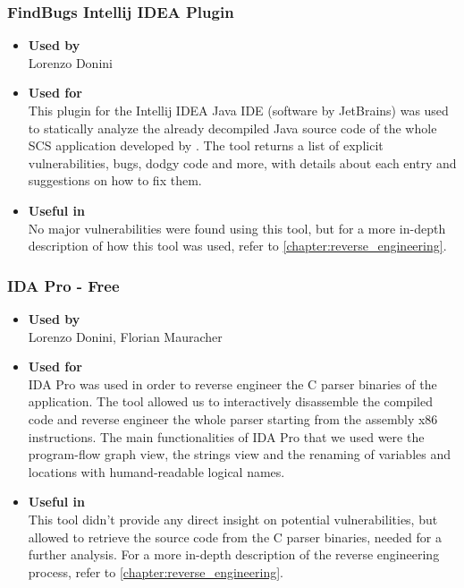 \subsubsection*{FindBugs Intellij IDEA Plugin}
\begin{itemize}
	\item \textbf{Used by}\\ Lorenzo Donini
	\item \textbf{Used for}\\ This plugin for the Intellij IDEA Java IDE (software by JetBrains) was used to statically analyze the already decompiled Java source code of the whole SCS application developed by \bs. The tool returns a list of explicit vulnerabilities, bugs, dodgy code and more, with details about each entry and suggestions on how to fix them.
	\item \textbf{Useful in}\\ No major vulnerabilities were found using this tool, but for a more in-depth  description of how this tool was used, refer to \ref{chapter:reverse_engineering}.
\end{itemize}

\subsubsection*{IDA Pro - Free}
\begin{itemize}
	\item \textbf{Used by}\\ Lorenzo Donini, Florian Mauracher
	\item \textbf{Used for}\\ IDA Pro was used in order to reverse engineer the C parser binaries of the \bs application. The tool allowed us to interactively disassemble the compiled code and reverse engineer the whole parser starting from the assembly x86 instructions.\newline
	The main functionalities of IDA Pro that we used were the program-flow graph view, the strings view and the renaming of variables and locations with humand-readable logical names.
	\item \textbf{Useful in}\\ This tool didn't provide any direct insight on potential vulnerabilities, but allowed to retrieve the source code from the C parser binaries, needed for a further analysis. For a more in-depth description of the reverse engineering process, refer to \ref{chapter:reverse_engineering}.
\end{itemize}

